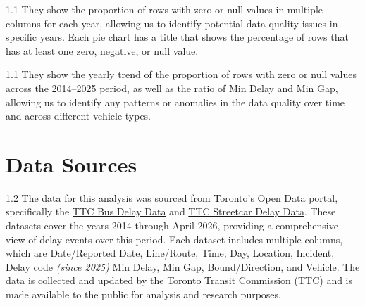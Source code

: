 \documentclass[11pt]{article}
\begin{document}
\vspace{-0.1em}
\begin{center}
\begin{minipage}[t]{0.475\textwidth}
\begin{tcolorbox}[colback=teal!10, colframe=teal!90, title=Pie Charts, fonttitle=\bfseries, height=5cm, valign=center]
\vfill
\begin{spacing}{1.1}
They show the proportion of rows with zero or null values in multiple columns for each year, 
allowing us to identify potential data quality issues in specific years. Each pie chart has
a title that shows the percentage of rows that has at least one zero, negative, or null value.
\end{spacing}
\vfill
\end{tcolorbox}
\end{minipage}
\hfill
\begin{minipage}[t]{0.475\textwidth}
\begin{tcolorbox}[colback=navyblue!10, colframe=navyblue!90, title=Bar Graphs and Line Graphs, fonttitle=\bfseries, height=5cm, valign=top]
\vfill
\begin{spacing}{1.1}
They show the yearly trend of the proportion of rows with zero or null values across the 
2014--2025 period, as well as the ratio of Min Delay and Min Gap, allowing us to identify 
any patterns or anomalies in the data quality over time and across different vehicle types.
\end{spacing}
\vfill
\end{tcolorbox}
\end{minipage}
\end{center}

\vspace{-0.85em}
\section{Data Sources}
\vspace{-0.25em}
\begin{spacing}{1.2}
The data for this analysis was sourced from Toronto's Open Data portal, specifically the
\href{https://open.toronto.ca/dataset/ttc-bus-delay-data}{TTC Bus Delay Data} and 
\href{https://open.toronto.ca/dataset/ttc-streetcar-delay-data}{TTC Streetcar Delay Data}. 
These datasets cover the years 2014 through April 2026, providing a comprehensive view of delay 
events over this period. Each dataset includes multiple columns, which are Date/Reported Date,
Line/Route, Time, Day, Location, Incident, Delay code \textit{(since 2025)} Min Delay, Min Gap, 
Bound/Direction, and Vehicle. The data is collected and updated by the Toronto Transit 
Commission (TTC) and is made available to the public for analysis and research purposes.
\end{spacing}
\end{document}
